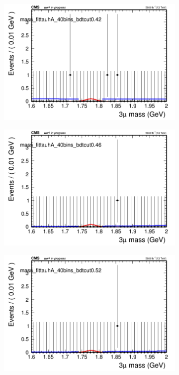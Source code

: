 \begin{figure}[H]
\begin{subfigure}{0.2\textwidth}
        \includegraphics[width=\textwidth]{power_law/plots/tauhA/massfit_tauhA_40bins_bdtcut0.42.png}
        \caption{}
    \end{subfigure}
    \begin{subfigure}{0.2\textwidth}
        \includegraphics[width=\textwidth]{power_law/plots/tauhA/massfit_tauhA_40bins_bdtcut0.46.png}
        \caption{}
    \end{subfigure}
    \begin{subfigure}{0.2\textwidth}
        \includegraphics[width=\textwidth]{power_law/plots/tauhA/massfit_tauhA_40bins_bdtcut0.52.png}

\end{subfigure}
\end{figure}
